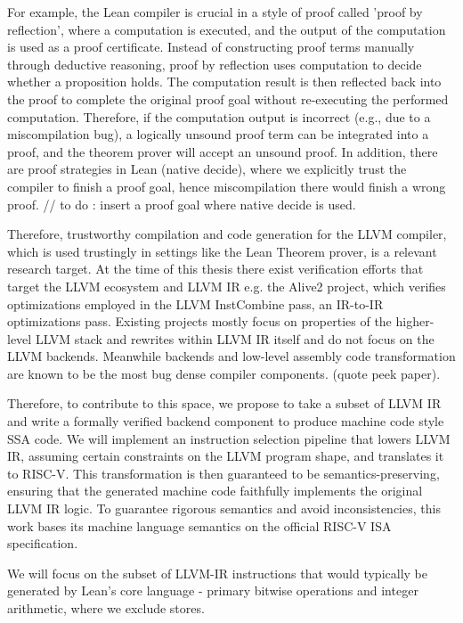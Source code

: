 For example, the Lean compiler is crucial in a style of proof called 'proof by reflection', where a computation is executed, and the output of the computation is used as a proof certificate. Instead of constructing proof terms manually through deductive reasoning, proof by reflection uses computation to decide whether a proposition holds. The computation result is then reflected back into the proof to complete the original proof goal without re-executing the performed computation.  Therefore, if the computation output is incorrect (e.g., due to a miscompilation bug), a logically unsound proof term can be integrated into a proof, and the theorem prover will accept an unsound proof. In addition, there are proof strategies in Lean (native decide), where we explicitly trust the compiler to finish a proof goal, hence miscompilation there would finish a wrong proof. 
// to do : insert a proof goal where native decide is used. 

Therefore, trustworthy compilation and code generation for the LLVM compiler, which is used trustingly in settings like the Lean Theorem prover, is a relevant research target. At the time of this thesis there exist verification efforts that target the LLVM ecosystem and LLVM IR e.g. the Alive2 project, which verifies optimizations employed in the LLVM InstCombine pass, an IR-to-IR optimizations pass. Existing projects mostly focus on properties of the higher-level LLVM stack and rewrites within LLVM IR itself and do not focus on the LLVM backends. Meanwhile backends and low-level assembly code transformation are known to be the most bug dense compiler components. (quote peek paper). 

Therefore, to contribute to this space, we propose to take a subset of LLVM IR and write a formally verified backend component to produce machine code style SSA code. We will implement an instruction selection pipeline that lowers LLVM IR, assuming certain constraints on the LLVM program shape, and translates it to RISC-V. This   transformation is then guaranteed to be semantics-preserving, ensuring that the generated machine code faithfully implements the original LLVM IR logic. To guarantee rigorous semantics and avoid inconsistencies, this work bases its machine language semantics on the official RISC-V ISA specification.  

We will focus on the subset of LLVM-IR instructions that would typically be generated by Lean’s core language - primary bitwise operations and integer arithmetic, where we exclude stores. 

